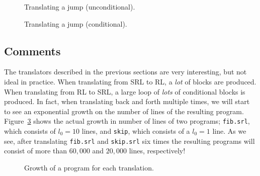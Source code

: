 \begin{figure}[H]
  
  \caption{Translating a jump (unconditional).}\label{fig:rltrlJumpGoto}
\end{figure}

\begin{figure}[H]
  
  \caption{Translating a jump (conditional).}\label{fig:rltrlJumpIf}
\end{figure}

\subsection{Comments}
The translators described in the previous sections are very interesting, but not ideal in practice. When translating from SRL to RL, a \textit{lot} of blocks are produced. When translating from RL to SRL, a large loop of \textit{lots} of conditional blocks is produced. In fact, when translating back and forth multiple times, we will start to see an exponential growth on the number of lines of the resulting program. Figure~\ref{fig:linesfig} shows the actual growth in number of lines of two programs; \texttt{fib.srl}, which consists of $l_0=10$ lines, and \texttt{skip}, which consists of a $l_0=1$ line. As we see, after translating \texttt{fib.srl} and \texttt{skip.srl} six times the resulting programs will consist of more than $60,000$ and $20,000$ lines, respectively!

\pgfplotsset{compat = 1.3}
\begin{figure}[H]
\centering


  \caption{Growth of a program for each translation.}\label{fig:linesfig}%
\end{figure}

